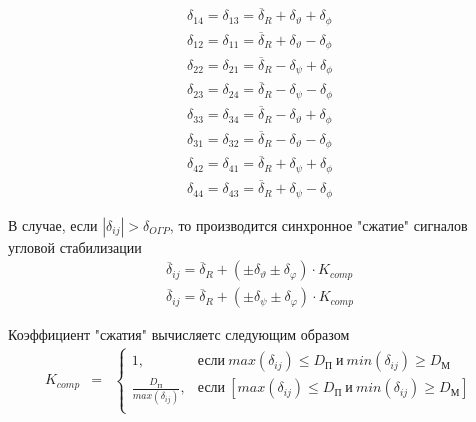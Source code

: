 \begin{equation}
	\begin{gathered}
		\delta_{14} = \delta_{13} = \overline{\delta}_R + \delta_\vartheta + \delta_\phi \\
		\delta_{12} = \delta_{11} = \overline{\delta}_R + \delta_\vartheta - \delta_\phi \\
		\delta_{22} = \delta_{21} = \overline{\delta}_R - \delta_\psi + \delta_\phi \\
		\delta_{23} = \delta_{24} = \overline{\delta}_R - \delta_\psi - \delta_\phi \\
		\delta_{33} = \delta_{34} = \overline{\delta}_R - \delta_\vartheta + \delta_\phi \\
		\delta_{31} = \delta_{32} = \overline{\delta}_R - \delta_\vartheta - \delta_\phi \\
		\delta_{42} = \delta_{41} = \overline{\delta}_R + \delta_\psi + \delta_\phi \\
		\delta_{44} = \delta_{43} = \overline{\delta}_R + \delta_\psi - \delta_\phi 
	\end{gathered}
\end{equation}

В случае, если $|\delta_{ij}| > \delta_{O\Gamma P}$, то производится синхронное "сжатие" сигналов угловой стабилизации
\begin{equation}
	\begin{gathered}
		\overline{\delta}_{ij} = \overline{\delta}_R + \left( \pm \delta_{\vartheta} \pm \delta_{\varphi} \right) \cdot K_{comp} \\
		\overline{\delta}_{ij} = \overline{\delta}_R + \left( \pm \delta_{\psi} \pm \delta_{\varphi} \right) \cdot K_{comp}
	\end{gathered}
\end{equation}

Коэффициент "сжатия" вычисляетс следующим образом
\begin{equation}
	\begin{matrix}
			K_{comp} & = & \left\{ \begin{matrix}
				1, & \text{если} \  max(\delta_{ij}) \leq D_{\text{П}} \  \text{и} \  min(\delta_{ij}) \geq D_\text{М} \\
				\frac{D_\text{П}}{max(\delta_{ij})}, &  \text{если} \  \left[max(\delta_{ij}) \leq D_{\text{П}} \  \text{и} \  min(\delta_{ij}) \geq D_\text{М} \right] \\
			\end{matrix}\right.
	\end{matrix} 
\end{equation}

\clearpage
